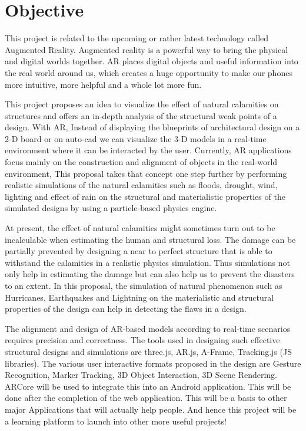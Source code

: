 \documentclass[BTech]{srmuthesis}
\begin{document}
\section{Objective}
This project is related to the upcoming or rather latest technology called Augmented Reality. Augmented reality is a powerful way to bring the physical and digital worlds together. AR places digital objects and useful information into the real world around us, which creates a huge opportunity to make our phones more intuitive, more helpful and a whole lot more fun.

This project proposes an idea to visualize the effect of natural calamities on structures and offers an in-depth analysis of the structural weak points of a design. With AR, Instead of displaying the blueprints of architectural design on a 2-D board or on auto-cad we can visualize the 3-D models in a real-time environment where it can be interacted by the user. Currently, AR applications focus mainly on the construction and alignment of objects in the real-world environment, This proposal takes that concept one step further by performing realistic simulations of the natural calamities such as floods,  drought, wind, lighting and effect of rain on the structural and materialistic properties of the simulated designs by using a particle-based physics engine. 

At present, the effect of natural calamities might sometimes turn out to be incalculable when estimating the human and structural loss. The damage can be partially prevented by designing a near to perfect structure that is able to withstand the calamities in a realistic physics simulation. Thus simulations not only help in estimating the damage but can also help us to prevent the disasters to an extent. In this proposal, the simulation of natural phenomenon such as Hurricanes, Earthquakes and Lightning on the materialistic and structural properties of the design can help in detecting the flaws in a design.

The alignment and design of AR-based models according to real-time scenarios requires precision and correctness. The tools used in designing such effective structural designs and simulations are three.js, AR.js, A-Frame, Tracking.js (\ac{JS} libraries). The various user interactive formats proposed in the design are Gesture Recognition, Marker Tracking, 3D Object Interaction, 3D Scene Rendering.
ARCore will be used to integrate this into an Android application. This will be done after the completion of the web application. This will be a basis to other major Applications that will actually help people. And hence this project will be a learning platform to launch into other more useful projects!
\end{document}
